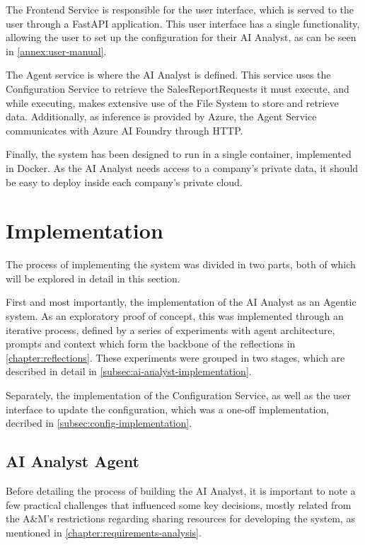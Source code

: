 \documentclass[a4paper]{report}
\begin{document}
The Frontend Service is responsible for the user interface, which is served to the user through a FastAPI application. This user interface has a single functionality, allowing the user to set up the configuration for their AI Analyst, as can be seen in \autoref{annex:user-manual}. 

The Agent service is where the AI Analyst is defined. This service uses the Configuration Service to retrieve the SalesReportRequests it must execute, and while executing, makes extensive use of the File System to store and retrieve data. Additionally, as inference is provided by Azure, the Agent Service communicates with Azure AI Foundry through HTTP.

Finally, the system has been designed to run in a single container, implemented in Docker. As the AI Analyst needs access to a company's private data, it should be easy to deploy inside each company's private cloud.

\section{Implementation}
\label{sec:implementation}

The process of implementing the system was divided in two parts, both of which will be explored in detail in this section.

First and most importantly, the implementation of the AI Analyst as an Agentic system. As an exploratory proof of concept, this was implemented through an iterative process, defined by a series of experiments with agent architecture, prompts and context which form the backbone of the reflections in \autoref{chapter:reflections}. These experiments were grouped in two stages, which are described in detail in \autoref{subsec:ai-analyst-implementation}.

Separately, the implementation of the Configuration Service, as well as the user interface to update the configuration, which was a one-off implementation, decribed in \autoref{subsec:config-implementation}.

\subsection{AI Analyst Agent}
\label{subsec:ai-analyst-implementation}

Before detailing the process of building the AI Analyst, it is important to note a few practical challenges that influenced some key decisions, mostly related from the A\&M's restrictions regarding sharing resources for developing the system, as mentioned in \autoref{chapter:requirements-analysis}.
\end{document}
